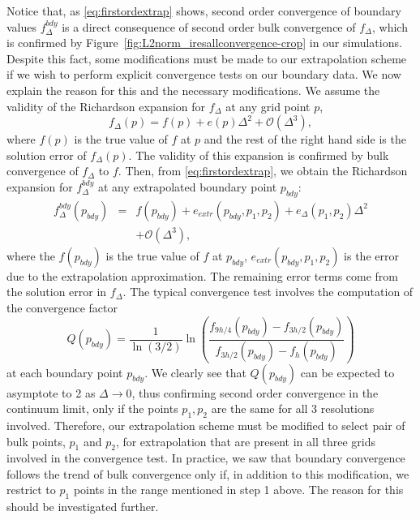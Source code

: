 \documentclass[aps,letterpaper,twocolumn,nofootinbib]{revtex4}
\numberwithin{equation}{section}
\begin{document}
Notice that, as \eqref{eq:firstordextrap} shows, second order convergence of boundary values $f^{bdy}_{\Delta}$ is a direct consequence of second order bulk convergence of $f_\Delta$, which is confirmed by Figure~\ref{fig:L2norm_iresallconvergence-crop} in our simulations. Despite this fact, some modifications must be made to our extrapolation scheme if we wish to perform explicit convergence tests on our boundary data. We now explain the reason for this and the necessary modifications. We assume the validity of the Richardson expansion \cite{doi:10.1098/rsta.1911.0009} for $f_{\Delta}$ at any grid point $p$,
\begin{equation}
\label{eq:Richexp}
f_\Delta(p)=f(p)+e(p)\Delta^2+\mathcal{O}(\Delta^3),
\end{equation}
where $f(p)$ is the true value of $f$ at $p$ and the rest of the right hand side is the solution error of $f_\Delta(p)$. The validity of this expansion is confirmed by bulk convergence of $f_\Delta$ to $f$.
Then, from \eqref{eq:firstordextrap}, we obtain the Richardson expansion for $f^{bdy}_{\Delta}$ at any extrapolated boundary point $p_{bdy}$:
 \begin{eqnarray}
 \label{eq:bdyRichexp}
 f^{bdy}_{\Delta}(p_{bdy})
&=&f(p_{bdy})+e_{extr}(p_{bdy},p_1,p_2)+e_\Delta(p_1,p_2)\Delta^2 \nonumber \\
&&+\mathcal{O}(\Delta^3),
 \end{eqnarray}
where the $f(p_{bdy})$ is the true value of $f$ at $p_{bdy}$, $e_{extr}(p_{bdy},p_1,p_2)$ is the error due to the extrapolation approximation. The remaining error terms come from the solution error in $f_\Delta$. The typical convergence test involves the computation of the convergence factor
\begin{equation}\label{eq:qconv}
Q(p_{bdy})=\frac{1}{\ln(3/2)}\ln\left( \frac{f_{9h/4}(p_{bdy})-f_{3h/2}(p_{bdy})}{f_{3h/2}(p_{bdy})-f_{h}(p_{bdy})} \right)
\end{equation}
at each boundary point $p_{bdy}$. We clearly see that $Q(p_{bdy})$ can be expected to asymptote to 2 as $\Delta\rightarrow0$, thus confirming second order convergence in the continuum limit, only if the points $p_1,p_2$ are the same for all 3 resolutions involved. Therefore, our extrapolation scheme must be modified to select pair of bulk points, $p_1$ and $p_2$, for extrapolation that are present in all three grids involved in the convergence test. 
In practice, we saw that boundary convergence follows the trend of bulk convergence only if, in addition to this modification, we restrict to $p_1$ points in the range mentioned in step 1 above. The reason for this should be investigated further. 
\end{document}
